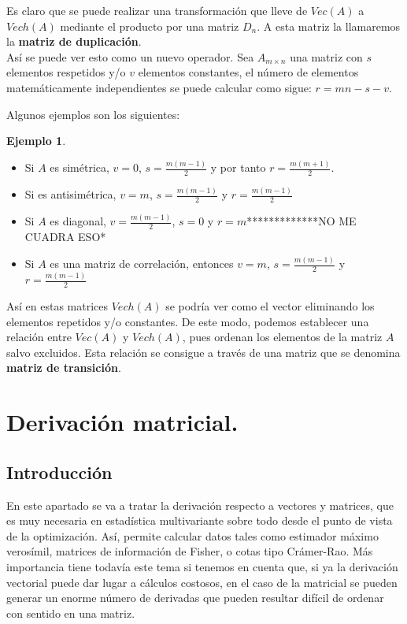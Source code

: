\documentclass{article}
\theoremstyle{theorem-style}  %
\theoremstyle{definition}
\theoremstyle{example-style}
\newtheorem{example}{Ejemplo}[section]
\begin{document}
Es claro que se puede realizar una transformación que lleve de $Vec(A)$ a $Vech(A)$ mediante el producto por una matriz $D_n$. A esta matriz la llamaremos la \textbf{matriz de duplicación}. \\

Así se puede ver esto como un nuevo operador. Sea $A_{m \times n}$ una matriz con $s$ elementos respetidos y/o $v$ elementos constantes, el número de elementos matemáticamente independientes se puede calcular como sigue: $r=mn-s-v$.  

Algunos ejemplos son los siguientes:

\begin{example}
	\begin{itemize}
		\item Si $A$ es simétrica, $v=0$, $s=\frac{m(m-1)}{2}$ y  por tanto $r=\frac{m(m+1)}{2}$.
		
		\item Si es antisimétrica, $v=m$, $s=\frac{m(m-1)}{2}$ y $r= \frac{m(m-1)}{2}$
		
		\item Si $A$ es diagonal, $v=\frac{m(m-1)}{2}$, $s=0$ y $r= m$*************NO ME CUADRA ESO* 
		
		\item Si $A$ es una matriz de correlación, entonces $v=m$, $s=\frac{m(m-1)}{2}$ y $r= \frac{m(m-1)}{2}$
	\end{itemize}
\end{example}

Así en estas matrices $Vech(A)$ se podría ver como el vector eliminando los elementos repetidos y/o constantes. De este modo, podemos establecer una relación entre $Vec(A)$ y $Vech(A)$, pues ordenan los elementos de la matriz $A$ salvo excluidos. Esta relación se consigue a través de una matriz que se denomina \textbf{matriz de transición}.
	
\section{Derivación matricial.}

\subsection{Introducción}

En este apartado se va a tratar la derivación respecto a vectores y matrices, que es muy necesaria en estadística multivariante sobre todo desde el punto de vista de la optimización. Así, permite calcular datos tales como estimador máximo verosímil, matrices de información de Fisher, o cotas tipo Crámer-Rao. Más importancia tiene todavía este tema si tenemos en cuenta que, si ya la derivación vectorial puede dar lugar a cálculos costosos, en el caso de la matricial se pueden generar un enorme número de derivadas que pueden resultar difícil de ordenar con sentido en una matriz. \\
\end{document}
